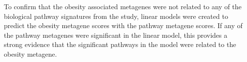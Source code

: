 To confirm that the obesity associated metagenes were not related to any of the biological pathway signatures from the \citet{Gatza2010a} study, linear models were created to predict the obesity metagene scores with the pathway metagene scores.
If any of the pathway metagenes were significant in the linear model, this provides a strong evidence that the significant pathways in the model were related to the obesity metagene.















































